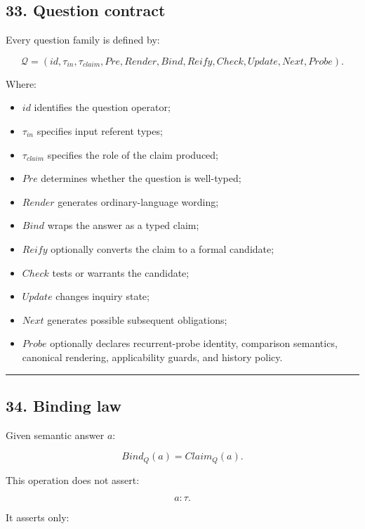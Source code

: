 \documentclass[
]{article}
\providecommand{\tightlist}{%
  \setlength{\itemsep}{0pt}\setlength{\parskip}{0pt}}
\begin{document}
\subsection{33. Question contract}\label{question-contract}

Every question family is defined by:

\[
\boxed{
\mathcal Q
=
(
id,
\tau_{in},
\tau_{claim},
Pre,
Render,
Bind,
Reify,
Check,
Update,
Next,
Probe
).
}
\]

Where:

\begin{itemize}
\tightlist
\item
  \(id\) identifies the question operator;
\item
  \(\tau_{in}\) specifies input referent types;
\item
  \(\tau_{claim}\) specifies the role of the claim produced;
\item
  \(Pre\) determines whether the question is well-typed;
\item
  \(Render\) generates ordinary-language wording;
\item
  \(Bind\) wraps the answer as a typed claim;
\item
  \(Reify\) optionally converts the claim to a formal candidate;
\item
  \(Check\) tests or warrants the candidate;
\item
  \(Update\) changes inquiry state;
\item
  \(Next\) generates possible subsequent obligations;
\item
  \(Probe\) optionally declares recurrent-probe identity, comparison semantics,
  canonical rendering, applicability guards, and history policy.
\end{itemize}

\begin{center}\rule{0.5\linewidth}{0.5pt}\end{center}

\subsection{34. Binding law}\label{binding-law}

Given semantic answer \(a\):

\[
\boxed{
Bind_Q(a)
=
Claim_Q(a).
}
\]

This operation does not assert:

\[
a:\tau.
\]

It asserts only:
\end{document}
